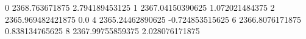 0 2368.763671875 2.794189453125
1 2367.04150390625 1.072021484375
2 2365.969482421875 0.0
4 2365.24462890625 -0.724853515625
6 2366.8076171875 0.838134765625
8 2367.99755859375 2.028076171875
